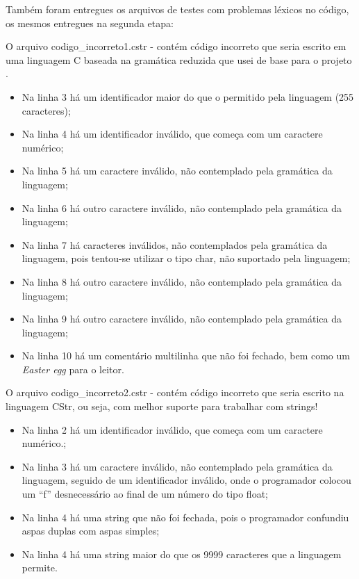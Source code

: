 \documentclass[12pt]{article}
\begin{document}
Também foram entregues os arquivos de testes com problemas léxicos no código, os mesmos entregues na segunda etapa:

O arquivo codigo\_incorreto1.cstr - contém código incorreto que seria escrito em uma linguagem C baseada na gramática reduzida que usei de base para o projeto \cite{minic}.
\begin{itemize}
	\item Na linha 3 há um identificador maior do que o permitido pela linguagem (255 caracteres);
	\item Na linha 4 há um identificador inválido, que começa com um caractere numérico;
	\item Na linha 5 há um caractere inválido, não contemplado pela gramática da linguagem;
	\item Na linha 6 há outro caractere inválido, não contemplado pela gramática da linguagem;
	\item Na linha 7 há caracteres inválidos, não contemplados pela gramática da linguagem, pois tentou-se utilizar o tipo char, não suportado pela linguagem;
	\item Na linha 8 há outro caractere inválido, não contemplado pela gramática da linguagem;
	\item Na linha 9 há outro caractere inválido, não contemplado pela gramática da linguagem;
	\item Na linha 10 há um comentário multilinha que não foi fechado, bem como um \textit{Easter egg} para o leitor.
\end{itemize}

O arquivo codigo\_incorreto2.cstr - contém código incorreto que seria escrito na linguagem CStr, ou seja, com melhor suporte para trabalhar com strings!\\
\begin{itemize}
	\item Na linha 2 há um identificador inválido, que começa com um caractere numérico.;
	\item Na linha 3 há um caractere inválido, não contemplado pela gramática da linguagem, seguido de um identificador inválido, onde o programador colocou um ``f'' desnecessário ao final de um número do tipo float;
	\item Na linha 4 há uma string que não foi fechada, pois o programador confundiu aspas duplas com aspas simples;
	\item Na linha 4 há uma string maior do que os 9999 caracteres que a linguagem permite.\\
\end{itemize}
\end{document}
